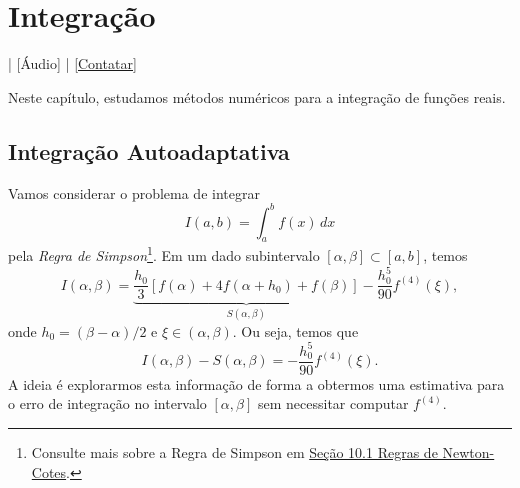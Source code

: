 

\chapter{Integração}\label{cap_integracao}
\thispagestyle{fancy}

\begin{flushright}
  [Vídeo] | [Áudio] | \href{https://phkonzen.github.io/notas/contato.html}{[Contatar]}
\end{flushright}

Neste capítulo, estudamos métodos numéricos para a integração de funções reais.

\section{Integração Autoadaptativa}\label{cap_integracao_sec_autoadapt}

Vamos considerar o problema de integrar
\begin{equation}
  I(a,b) = \int_a^b f(x)\,dx
\end{equation}
pela \emph{Regra de Simpson}\footnote{Consulte mais sobre a Regra de Simpson em \href{https://phkonzen.github.io/notas/MatematicaNumerica/cap_integr_sec_NC.html}{Seção 10.1 Regras de Newton-Cotes}.}. Em um dado subintervalo $[\alpha, \beta]\subset [a, b]$, temos
\begin{equation}
  I(\alpha, \beta) = \underbrace{\frac{h_0}{3}\left[f(\alpha) + 4f(\alpha+h_0) + f(\beta)\right]}_{S(\alpha,\beta)}-\frac{h_0^5}{90}f^{(4)}(\xi),
\end{equation}
onde $h_0=(\beta-\alpha)/2$ e $\xi\in (\alpha, \beta)$. Ou seja, temos que
\begin{equation}\label{eq:estS1}
  I(\alpha,\beta) - S(\alpha,\beta) = -\frac{h_0^5}{90}f^{(4)}(\xi).
\end{equation}
A ideia é explorarmos esta informação de forma a obtermos uma estimativa para o erro de integração no intervalo $[\alpha,\beta]$ sem necessitar computar $f^{(4)}$.

